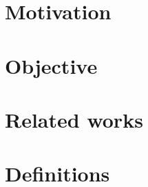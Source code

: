 \section{Motivation}
\label{section_intro_motivation}

\section{Objective}
\label{section_intro_objective}

\section{Related works}
\label{section_intro_relatedwork}

\section{Definitions}
\label{section_intro_definitions}
